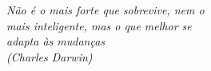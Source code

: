 
\vspace*{\fill}
\begin{flushright}
    \textit{Não é o mais forte que sobrevive, nem o \\
            mais inteligente, mas o que melhor se \\
            adapta às mudanças \\
           (Charles Darwin)}
\end{flushright}
